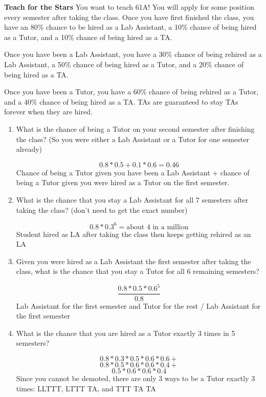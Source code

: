 \question \textbf{Teach for the Stars}\newline
 You want to teach 61A! You will apply for some position every semester after taking the class. Once you have first finished the class, you have an 80\% chance to be hired as a Lab Assistant, a 10\% chance of being hired as a Tutor, and a 10\% chance of being hired as a TA. 

Once you have been a Lab Assistant, you have a 30\% chance of being rehired as a Lab Assistant, a 50\% chance of being hired as a Tutor, and a 20\% chance of being hired as a TA. 

Once you have been a Tutor, you have a 60\% chance of being rehired as a Tutor, and a 40\% chance of being hired as a TA. TAs are guaranteed to stay TAs forever when they are hired.

\begin{enumerate}
\item  What is the chance of being a Tutor on your second semester after finishing the class? (So you were either a Lab Assistant or a Tutor for one semester already)
\begin{solution}
\[0.8 * 0.5 + 0.1 * 0.6 = 0.46  \]
	Chance of being a Tutor given you have been a Lab Assistant + chance of being a Tutor given you were hired as a Tutor on the first semester.
\end{solution}

\item What is the chance that you stay a Lab Assistant for all 7 semesters after taking the class? (don’t need to get the exact number)
\begin{solution}
\[0.8 * 0.3^6 = \text{about 4 in a million}\]
		Student hired as LA after taking the class then keeps getting rehired as an LA
\end{solution}

\item Given you were hired as a Lab Assistant the first semester after taking the class, what is the chance that you stay a Tutor for all 6 remaining semesters?
\begin{solution}
\[\frac{0.8 * 0.5 * 0.6^5}{0.8} \]
		Lab Assistant for the first semester and Tutor for the rest / Lab Assistant for the first semester
\end{solution}

\item What is the chance that you are hired as a Tutor exactly 3 times in 5 semesters?
\begin{solution}
\[0.8 * 0.3 * 0.5 * 0.6 * 0.6 +\]
\[0.8 * 0.5 * 0.6 * 0.6 * 0.4 +\]
\[0.5 * 0.6 * 0.6 * 0.4\]
Since you cannot be demoted, there are only 3 ways to be a Tutor exactly 3 times: LLTTT, LTTT TA, and TTT TA TA
\end{solution}


\end{enumerate}
